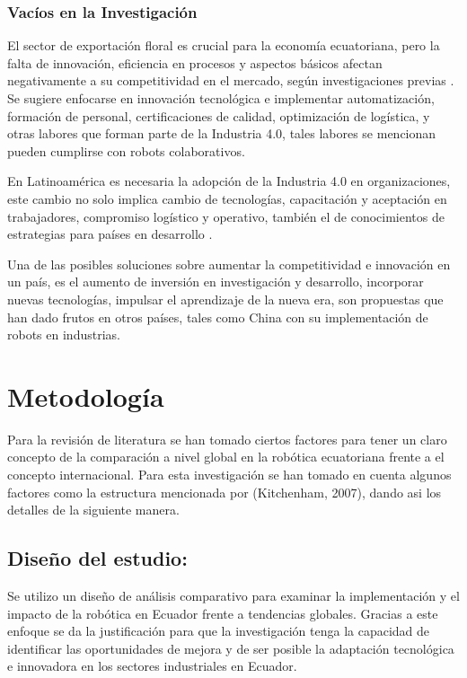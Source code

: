 \documentclass[conference]{IEEEtran}
\begin{document}
\subsubsection{Vacíos en la Investigación}

El sector de exportación floral es crucial para la economía ecuatoriana, pero la falta de innovación, eficiencia en procesos y aspectos básicos afectan negativamente a su competitividad en el mercado, según investigaciones previas \cite{Guaita}. Se sugiere enfocarse en innovación tecnológica e implementar automatización, formación de personal, certificaciones de calidad, optimización de logística, y otras labores que forman parte de la Industria 4.0, tales labores se mencionan pueden cumplirse con robots colaborativos\cite{Goel2020}. 

En Latinoamérica es necesaria la adopción de la Industria 4.0 en organizaciones, este cambio no solo implica cambio de tecnologías, capacitación y aceptación en trabajadores, compromiso logístico y operativo, también el de conocimientos de estrategias para países en desarrollo \cite{Cordero2023}.

Una de las posibles soluciones sobre aumentar la competitividad e innovación en un país, es el aumento de inversión en investigación y desarrollo, incorporar nuevas tecnologías, impulsar el aprendizaje de la nueva era, son propuestas que han dado frutos en otros países, tales como China con su implementación de robots en industrias\cite{Cheng2019}.

\section{Metodología}

Para la revisión de literatura se han tomado ciertos factores para tener un claro concepto de la comparación a nivel global en la robótica ecuatoriana frente a el concepto internacional. Para esta investigación se han tomado en cuenta algunos factores como la estructura mencionada por (Kitchenham, 2007), dando asi los detalles de la siguiente manera.

\subsection{Diseño del estudio: }

Se utilizo un diseño de análisis comparativo para examinar la implementación y el impacto de la robótica en Ecuador frente a tendencias globales. Gracias a este enfoque se da la justificación para que la investigación tenga la capacidad de identificar las oportunidades de mejora y de ser posible la adaptación tecnológica e innovadora en los sectores industriales en Ecuador.
\end{document}

